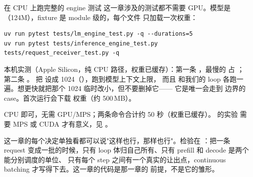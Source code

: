 \begin{tipbox}{在 CPU 上跑完整的 engine 测试}
这一章涉及的测试都不需要 GPU。模型是 （124M），fixture 是 module 级的，每个文件
只加载一次权重：

\begin{lstlisting}[style=hlshell]
uv run pytest tests/lm_engine_test.py -q --durations=5
uv run pytest tests/inference_engine_test.py tests/request_receiver_test.py -q
\end{lstlisting}

本机实测（Apple Silicon，纯 CPU 路径，权重已缓存）：第一条 ，最慢的
 占 ；第二条 。 把
 设成 1024（），跑到模型上下文上限，
而且  和我们的 loop 各跑一遍。想更快就把那个 1024 临时改小，但不要删掉它——
它是唯一会走到  边界的 case。首次运行会下载  权重（约 500\,MB）。

\resources CPU 即可，无需 GPU/MPS；两条命令合计约 50 秒（权重已缓存）。 的实验
需要 MPS 或 CUDA 才有意义，见 。
\end{tipbox}

这一章的每个决定单独看都可以说"这样也行，那样也行"。检验在 ：把一条
request 变成一批的时候，只有 loop 体归自己所有、只有 prefill 和 decode 是两个能分别调度的单位、
只有每个 step 之间有一个真实的让出点，continuous batching 才写得下去。这一章的代码是那一章的
前提，不是它的雏形。
